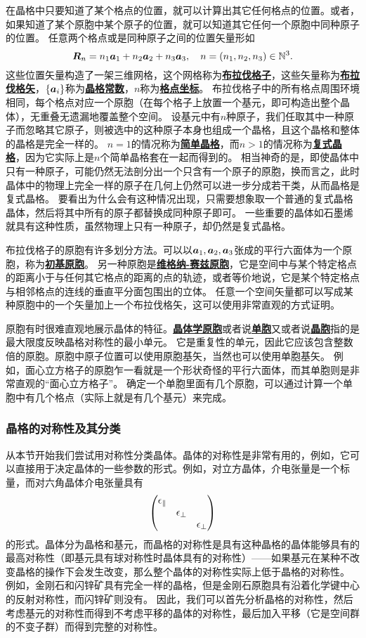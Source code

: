 \documentclass[hyperref, UTF8, a4paper]{ctexart}
\newcommand*{\concept}[1]{\underline{\textbf{#1}}}
\begin{document}
在晶格中只要知道了某个格点的位置，就可以计算出其它任何格点的位置。或者，如果知道了某个原胞中某个原子的位置，就可以知道其它任何一个原胞中同种原子的位置。
任意两个格点或是同种原子之间的位置矢量形如
\begin{equation}
    \vb*{R}_n = n_1 \vb*{a}_1 + n_2 \vb*{a}_2 + n_3 \vb*{a}_3, \quad n = (n_1, n_2, n_3) \in \mathbb{N}^3.
\end{equation}
这些位置矢量构造了一架三维网格，这个网格称为\concept{布拉伐格子}，这些矢量称为\concept{布拉伐格矢}，$\{\vb*{a}_i\}$称为\concept{晶格常数}，$n$称为\concept{格点坐标}。
布拉伐格子中的所有格点周围环境相同，每个格点对应一个原胞（在每个格子上放置一个基元，即可构造出整个晶体），无重叠无遗漏地覆盖整个空间。
设基元中有$n$种原子，我们任取其中一种原子而忽略其它原子，则被选中的这种原子本身也组成一个晶格，且这个晶格和整体的晶格是完全一样的。
$n=1$的情况称为\concept{简单晶格}，而$n>1$的情况称为\concept{复式晶格}，因为它实际上是$n$个简单晶格套在一起而得到的。
相当神奇的是，即使晶体中只有一种原子，可能仍然无法剖分出一个只含有一个原子的原胞，换而言之，此时晶体中的物理上完全一样的原子在几何上仍然可以进一步分成若干类，从而晶格是复式晶格。
要看出为什么会有这种情况出现，只需要想象取一个普通的复式晶格晶体，然后将其中所有的原子都替换成同种原子即可。
一些重要的晶体如石墨烯就具有这种性质，虽然物理上只有一种原子，却仍然是复式晶格。

布拉伐格子的原胞有许多划分方法。可以以$\vb*{a}_1, \vb*{a}_2, \vb*{a}_3$张成的平行六面体为一个原胞，称为\concept{初基原胞}。
另一种原胞是\concept{维格纳-赛兹原胞}，它是空间中与某个特定格点的距离小于与任何其它格点的距离的点的轨迹，或者等价地说，它是某个特定格点与相邻格点的连线的垂直平分面包围出的立体。
任意一个空间矢量都可以写成某种原胞中的一个矢量加上一个布拉伐格矢，这可以使用非常直观的方式证明。

原胞有时很难直观地展示晶体的特征。\concept{晶体学原胞}或者说\concept{单胞}又或者说\concept{晶胞}指的是最大限度反映晶格对称性的最小单元。
它是重复性的单元，因此它应该包含整数倍的原胞。原胞中原子位置可以使用原胞基矢，当然也可以使用单胞基矢。
例如，面心立方格子的原胞乍一看就是一个形状奇怪的平行六面体，而其单胞则是非常直观的“面心立方格子”。
确定一个单胞里面有几个原胞，可以通过计算一个单胞中有几个格点（实际上就是有几个基元）来完成。

\subsubsection{晶格的对称性及其分类}

从本节开始我们尝试用对称性分类晶体。晶体的对称性是非常有用的，例如，它可以直接用于决定晶体的一些参数的形式。例如，对立方晶体，介电张量是一个标量，而对六角晶体介电张量具有
\[
    \pmqty{\dmat{\epsilon_\parallel, \epsilon_\bot, \epsilon_\bot}}
\]
的形式。晶体分为晶格和基元，而晶格的对称性是具有这种晶格的晶体能够具有的最高对称性（即基元具有球对称性时晶体具有的对称性）——如果基元在某种不改变晶格的操作下会发生改变，那么整个晶体的对称性实际上低于晶格的对称性。
例如，金刚石和闪锌矿具有完全一样的晶格，但是金刚石原胞具有沿着化学键中心的反射对称性，而闪锌矿则没有。 %
因此，我们可以首先分析晶格的对称性，然后考虑基元的对称性而得到不考虑平移的晶体的对称性，最后加入平移（它是空间群的不变子群）而得到完整的对称性。
\end{document}
